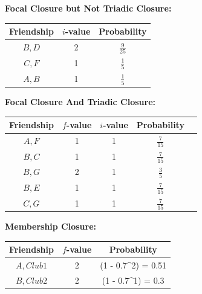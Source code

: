 \documentclass[12pt]{article}
\begin{document}
\section{}
\subsection{}
\textbf{Focal Closure but Not Triadic Closure:}
\newline 
\newline 
\begin{tabular}{ |c|c|c| } 
\hline
Friendship & $i$-value & Probability \\
\hline
$B,D$ & 2 & $\frac{9}{25}$ \\
\hline
$C,F$ & 1 & $\frac{1}{5}$ \\ 
\hline
$A,B$ & 1 & $\frac{1}{5}$\\  
\hline
\end{tabular}
\newline 
\newline 
\newline 
\textbf{Focal Closure And Triadic Closure:}
\newline 
\newline 
\begin{tabular}{ |c|c|c|c|c| } 
\hline
Friendship & $f$-value & $i$-value & Probability \\
\hline
$A,F$ & 1 & 1 & $\frac{7}{15}$ \\ 
\hline
$B,C$ & 1 & 1 & $\frac{7}{15}$ \\ 
\hline
$B,G$ & 2 & 1 & $\frac{3}{5}$\\ 
\hline
$B,E$ & 1 & 1 & $\frac{7}{15}$ \\ 
\hline
$C,G$ & 1 & 1 & $\frac{7}{15}$ \\ 
\hline
\end{tabular}
\newline 
\newline 
\newline 
\textbf{Membership Closure:}
\newline 
\newline 
\begin{tabular}{ |c|c|c| } 
\hline
Friendship & $f$-value & Probability \\
\hline
$A, Club1$ & 2 & (1 - 0.7^2) = 0.51 \\
\hline
$B, Club2$ & 2 & (1 - 0.7^1) = 0.3 \\ 
\hline
\end{tabular}
\newpage
\end{document}
